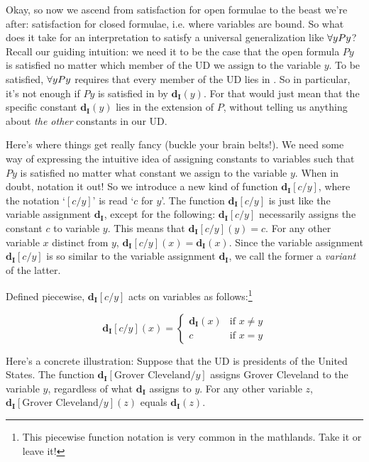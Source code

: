 {\color{black}Okay, so now we ascend from satisfaction for open formulae to the beast we're after: satisfaction for closed formulae, i.e. where variables are bound. So what does it take for an interpretation to satisfy a universal generalization like $\forall y Py$? Recall our guiding intuition: we need it to be the case that the open formula $Py$ is satisfied no matter which member of the UD we assign to the variable $y$. To be satisfied, $\forall y Py$ requires that every member of the UD lies in . So in particular,} it's not enough if $Py$ is satisfied in  by $\mathbf{d_I}(y)$. For that would just mean that the specific constant $\mathbf{d_I}(y)$ lies in the extension of $P$, without telling us anything about \textit{the other} constants in our UD. 

{\color{black}Here's where things get really fancy (buckle your brain belts!). We need some way of expressing the intuitive idea of assigning constants to variables such that $Py$ is satisfied no matter what constant we assign to the variable $y$. When in doubt, notation it out! So we introduce a new kind of function $\mathbf{d_I} [c / y]$, where the notation `$[c/y]$' is read `$c$ for $y$'. The function $\mathbf{d_I} [c / y]$ is just like the variable assignment $\mathbf{d_I}$, except for the following: $\mathbf{d_I} [c / y]$ necessarily assigns the constant $c$ to variable $y$. This means that $\mathbf{d_I} [c / y] (y) = c$. For any other variable $x$ distinct from $y$, $\mathbf{d_I} [c / y] (x) = \mathbf{d_I}(x)$. Since the variable assignment $\mathbf{d_I} [c / y]$ is so similar to the variable assignment $\mathbf{d_I}$, we call the former a \textit{variant} of the latter.} 

Defined piecewise, $\mathbf{d_I} [c / y]$ acts on variables as follows:\footnote{This piecewise function notation is very common in the mathlands. Take it or leave it!}

\begin{equation}
\mathbf{d_I} [c / y](x)=
    \begin{cases}
        \mathbf{d_I}(x) & \text{if } x \neq y \\
        c & \text{if } x =y 
    \end{cases}
\end{equation}

Here's a concrete illustration: Suppose that the UD is presidents of the United States. The function $\mathbf{d_I}[\mbox{Grover Cleveland}/y]$ assigns Grover Cleveland to the variable $y$, regardless of what $\mathbf{d_I}$ assigns to $y$. For any other variable $z$, $\mathbf{d_I}[\mbox{Grover Cleveland}/y](z)$ equals $\mathbf{d_I}(z)$.


